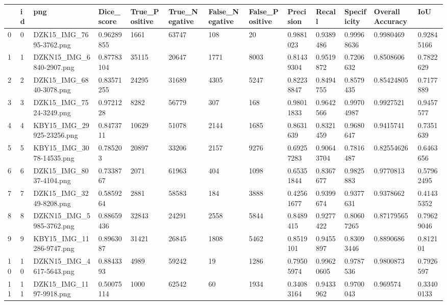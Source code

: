 \documentclass[11pt, a4paper, twoside]{report}
\begin{document}
\begin{longtable}[c]{@{}lllllllllllll@{}}
\toprule
 & id & png & Dice\_score & True\_Positive & True\_Negative & False\_Negative & False\_Positive & Precision & Recall & Specificity & Overall Accuracy & IoU \\* \midrule
\endhead
%
\bottomrule
\endfoot
%
\endlastfoot
%
0 & 0 & DZK15\_IMG\_7695-3762.png & 0.96289855 & 1661 & 63747 & 108 & 20 & 0.9881023 & 0.9389486 & 0.99968636 & 0.9980469 & 0.92845166 \\
1 & 1 & DZKN15\_IMG\_6840-2907.png & 0.87783104 & 35115 & 20647 & 1771 & 8003 & 0.81439304 & 0.9519872 & 0.7206632 & 0.8508606 & 0.7822629 \\
2 & 2 & DZK15\_IMG\_6840-3078.png & 0.83571255 & 24295 & 31689 & 4305 & 5247 & 0.82238847 & 0.8494755 & 0.8579435 & 0.85424805 & 0.7177889 \\
3 & 3 & DZK15\_IMG\_7524-3249.png & 0.9721228 & 8282 & 56779 & 307 & 168 & 0.98011833 & 0.9642566 & 0.99704987 & 0.9927521 & 0.9457577 \\
4 & 4 & KBY15\_IMG\_29925-23256.png & 0.8473711 & 10629 & 51078 & 2144 & 1685 & 0.8631639 & 0.8321459 & 0.9680647 & 0.9415741 & 0.7351639 \\
5 & 5 & KBY15\_IMG\_3078-14535.png & 0.785203 & 20897 & 33206 & 2157 & 9276 & 0.69257283 & 0.90643704 & 0.7816487 & 0.82554626 & 0.6463656 \\
6 & 6 & DZK15\_IMG\_8037-4104.png & 0.7338767 & 2071 & 61963 & 404 & 1098 & 0.65351844 & 0.8367677 & 0.9825883 & 0.9770813 & 0.57962495 \\
7 & 7 & DZK15\_IMG\_3249-8208.png & 0.5859264 & 2881 & 58583 & 184 & 3888 & 0.42561677 & 0.9399674 & 0.9377631 & 0.9378662 & 0.41435352 \\
8 & 8 & DZKN15\_IMG\_5985-3762.png & 0.88659436 & 32843 & 24291 & 2558 & 5844 & 0.8489415 & 0.9277422 & 0.80607265 & 0.87179565 & 0.79629046 \\
9 & 9 & KBY15\_IMG\_11286-9747.png & 0.8963087 & 31421 & 26845 & 1808 & 5462 & 0.8519101 & 0.9455897 & 0.83093446 & 0.8890686 & 0.812101 \\
10 & 10 & DZKN15\_IMG\_4617-5643.png & 0.8843393 & 4989 & 59242 & 19 & 1286 & 0.79505974 & 0.99620605 & 0.9787536 & 0.9800873 & 0.7926597 \\
11 & 11 & DZK15\_IMG\_1197-9918.png & 0.50075114 & 1000 & 62542 & 60 & 1934 & 0.34083164 & 0.9433962 & 0.9700043 & 0.969574 & 0.33400133 \\

\end{longtable}
\end{document}

